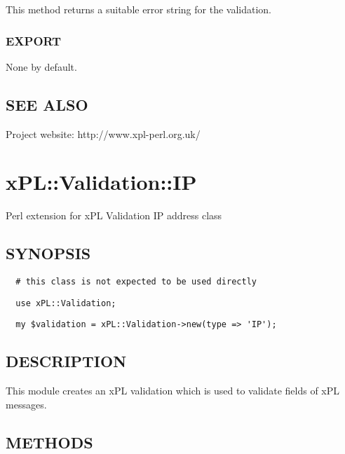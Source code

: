 This method returns a suitable error string for the validation.

\subsubsection*{EXPORT\label{xPL::Validation::IntegerRange_EXPORT}}


None by default.

\subsection*{SEE ALSO\label{xPL::Validation::IntegerRange_SEE_ALSO}}


Project website: http://www.xpl-perl.org.uk/

\section{xPL::Validation::IP\label{xPL::Validation::IP}}


Perl extension for xPL Validation IP address class

\subsection*{SYNOPSIS\label{xPL::Validation::IP_SYNOPSIS}}
\begin{verbatim}
  # this class is not expected to be used directly
\end{verbatim}
\begin{verbatim}
  use xPL::Validation;
\end{verbatim}
\begin{verbatim}
  my $validation = xPL::Validation->new(type => 'IP');
\end{verbatim}
\subsection*{DESCRIPTION\label{xPL::Validation::IP_DESCRIPTION}}


This module creates an xPL validation which is used to validate fields
of xPL messages.

\subsection*{METHODS\label{xPL::Validation::IP_METHODS}}

